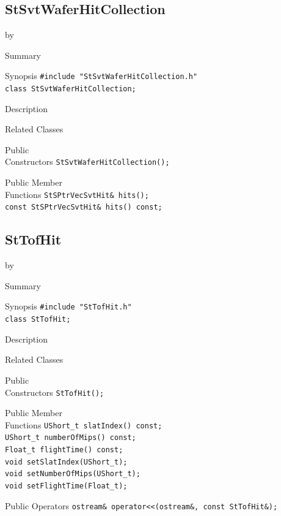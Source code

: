 \documentclass[twoside]{article}
\newcommand{\entrylabel}[1]{\mbox{\textbf{{#1}}}\hfil}%
\newenvironment{entry}
{\begin{list}{}%
    {\renewcommand{\makelabel}{\entrylabel}%
     \setlength{\labelwidth}{90pt}%
     \setlength{\leftmargin}{\labelwidth}
     \advance\leftmargin by \labelsep%
      }%
    }%
  {\end{list}}
\newcommand{\Entrylabel}[1]%
{\raisebox{0pt}[1ex][0pt]{\makebox[\labelwidth][l]%
    {\parbox[t]{\labelwidth}{\hspace{0pt}\textbf{{#1}}}}}}
\newenvironment{Entry}%
{\renewcommand{\entrylabel}{\Entrylabel}\begin{entry}}%
  {\end{entry}}
\begin{document}
\subsection{StSvtWaferHitCollection}
\label{sec:StSvtWaferHitCollection}
\begin{Entry}
\item[Summary]
\item[Synopsis]
    \verb+#include "StSvtWaferHitCollection.h"+\\
    \verb+class StSvtWaferHitCollection;+\\
\item[Description]
\item[Related Classes]
\item[Public\\ Constructors]
    \verb+StSvtWaferHitCollection();+\\
\item[Public Member\\ Functions]
    \verb+StSPtrVecSvtHit& hits();+\\
    \verb+const StSPtrVecSvtHit& hits() const;+\\
\end{Entry}
\clearpage

\subsection{StTofHit}
\label{sec:StTofHit}
\begin{Entry}
\item[Summary]
\item[Synopsis]
    \verb+#include "StTofHit.h"+\\
    \verb+class StTofHit;+\\
\item[Description]
\item[Related Classes]
\item[Public\\ Constructors]
    \verb+StTofHit();+\\
\item[Public Member\\ Functions]
    \verb+UShort_t slatIndex() const;+\\
    \verb+UShort_t numberOfMips() const;+\\
    \verb+Float_t flightTime() const;+\\
    \verb+void setSlatIndex(UShort_t);+\\
    \verb+void setNumberOfMips(UShort_t);+\\
    \verb+void setFlightTime(Float_t);+\\
\item[Public Operators]
    \verb+ostream& operator<<(ostream&, const StTofHit&);+\\
\end{Entry}
\clearpage
\end{document}
